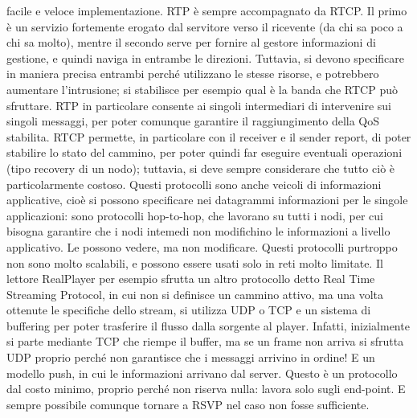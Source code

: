 facile e veloce implementazione.
RTP è sempre accompagnato da RTCP. Il primo è un servizio fortemente erogato dal servitore verso il ricevente (da chi 
sa poco a chi sa molto), mentre il secondo serve per fornire al gestore informazioni di gestione, e quindi naviga
in entrambe le direzioni. Tuttavia, si devono specificare in maniera precisa entrambi perché utilizzano le stesse
risorse, e potrebbero aumentare l'intrusione; si stabilisce per esempio qual è la banda che RTCP può sfruttare. 
RTP in particolare consente ai singoli intermediari di intervenire sui singoli messaggi, per poter comunque garantire 
il raggiungimento della QoS stabilita. RTCP permette, in particolare con il receiver e il sender report, di poter
stabilire lo stato del cammino, per poter quindi far eseguire eventuali operazioni (tipo recovery di un nodo); 
tuttavia, si deve sempre considerare che tutto ciò è particolarmente costoso.
Questi protocolli sono anche veicoli di informazioni applicative, cioè si possono specificare nei datagrammi
informazioni per le singole applicazioni: sono protocolli hop-to-hop, che lavorano su tutti i nodi, per cui bisogna
garantire che i nodi intemedi non modifichino le informazioni a livello applicativo. Le possono vedere, ma non
modificare.
Questi protocolli purtroppo non sono molto scalabili, e possono essere usati solo in reti molto limitate. Il lettore
RealPlayer per esempio sfrutta un altro protocollo detto Real Time Streaming Protocol, in cui non si definisce un
cammino attivo, ma una volta ottenute le specifiche dello stream, si utilizza UDP o TCP e un sistema di buffering per
poter trasferire il flusso dalla sorgente al player. Infatti, inizialmente si parte mediante TCP che riempe il buffer,
ma se un frame non arriva si sfrutta UDP proprio perché non garantisce che i messaggi arrivino in ordine! E un modello
push, in cui le informazioni arrivano dal server. Questo è un protocollo dal costo minimo, proprio perché non riserva
nulla: lavora solo sugli end-point. E sempre possibile comunque tornare a RSVP nel caso non fosse sufficiente.
